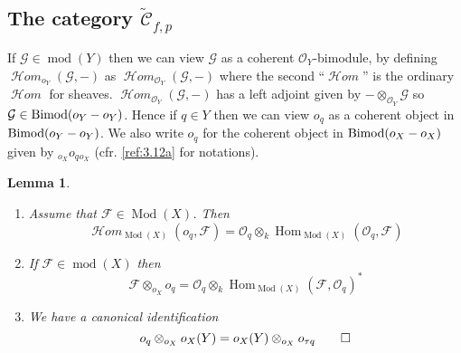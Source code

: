 \documentclass{amsproc}
\def\Cscr{{\mathcal C}}
\def\Fscr{{\mathcal F}}
\def\Gscr{{\mathcal G}}
\def\Hscr{{\mathcal H}}
\def\Oscr{{\mathcal O}}
\def\HHom{\operatorname {\Hscr \mathit{om}}}
\def\Bimod{\mathop{\text{Bimod}}}
\def\Hom{\operatorname {Hom}}
\def\HHom{\operatorname {\Hscr \mathit{om}}}
\def\coh{\operatorname {mod}}
\def\Qch{\operatorname {Mod}}
\let\oldtext\text
\def\text#1{\oldtext{\upshape #1}}
\newtheorem{lemmas}{Lemma}[subsection]
\theoremstyle{definition}
\theoremstyle{remark}
\numberwithin{equation}{section}
\numberwithin{table}{section}
\numberwithin{figure}{section}
\begin{document}
\subsection[The category $\tilde{\Cscr}_{f,p}$]{The category 
{\boldmath $\tilde{\Cscr}_{f,p}$}}
\label{ref:5.5b}

\leavevmode

If $\Gscr\in\coh(Y)$ then we can view $\Gscr$ as a coherent
$\Oscr_Y$-bimodule, by defining $\HHom_{o_Y}(\Gscr,-)$ as
$\HHom_{\Oscr_Y}(\Gscr,-)$ where the second ``$\HHom$'' is the
ordinary $\HHom$ for sheaves.  $\HHom_{\Oscr_Y}(\Gscr,-)$ has a left adjoint
given by $-\otimes_{\Oscr_Y} \Gscr$ so
$\Gscr\in\Bimod(o_Y-o_Y)$. Hence if $q\in Y$ then we can view $o_q$
as a coherent object in $\Bimod(o_Y-o_Y)$. We also write $o_q$
for the coherent object in $\Bimod(o_X-o_X)$ given by ${}_{o_X} o_q
{}_{o_X}$ (cfr. \eqref{ref:3.12a} for notations).
\begin{lemmas} 
\label{ref:5.5.1a}
\begin{enumerate}
\item Assume that $\Fscr\in\Qch(X)$. Then 
\begin{equation}
\label{ref:5.23a}
\HHom_{\Qch(X)}(o_q,\Fscr)=\Oscr_q\otimes_k \Hom_{\Qch(X)}(\Oscr_q,\Fscr)
\end{equation}
\item
If $\Fscr\in \coh(X)$ then
\begin{equation}
\label{ref:5.24a}
\Fscr\otimes_{o_X} o_q=\Oscr_q\otimes_k \Hom_{\Qch(X)}(\Fscr,\Oscr_q)^\ast
\end{equation}
\item
We have a canonical identification
\begin{equation}
\label{ref:5.25a}
o_q\otimes_{o_X} o_X(Y)=o_X(Y)\otimes_{o_X} o_{\tau q}
\qed\end{equation}
\end{enumerate}
\end{lemmas}
\end{document}
